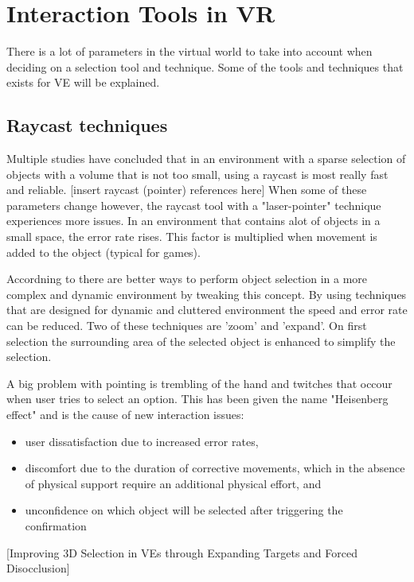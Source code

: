 \section{Interaction Tools in VR}
There is a lot of parameters in the virtual world to take into account when deciding on a selection tool and technique. Some of the tools and techniques that exists for VE will be explained.

\subsection{Raycast techniques}
Multiple studies have concluded that in an environment with a sparse selection of objects with a volume that is not too small, using a raycast is most really fast and reliable. [insert raycast (pointer) references here] When some of these parameters change however, the raycast tool with a "laser-pointer" technique experiences more issues. In an environment that contains alot of objects in a small space, the error rate rises. This factor is multiplied when movement is added to the object (typical for games).

Accordning to %
 there are better ways to perform object selection in a more complex and dynamic environment by tweaking this concept. By using techniques that are designed for dynamic and cluttered environment the speed and error rate can be reduced. Two of these techniques are 'zoom' and 'expand'. On first selection the surrounding area of the selected object is enhanced to simplify the selection.

A big problem with pointing is trembling of the hand and twitches that occour when user tries to select an option. This has been given the name "Heisenberg effect" and is the cause of new interaction issues:

\begin{itemize}
\item user dissatisfaction due to increased error rates,
\item discomfort due to the duration of corrective movements, which in the absence of physical support require an additional physical effort, and
\item unconfidence on which object will be selected after triggering the confirmation
\end{itemize}
[Improving 3D Selection in VEs through Expanding Targets and Forced Disocclusion]
